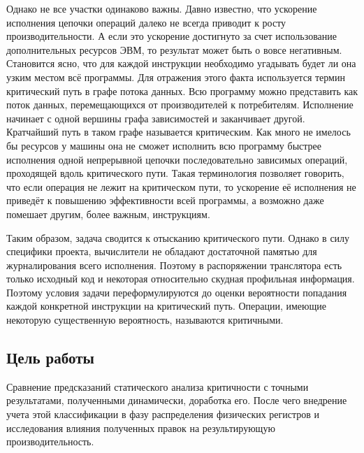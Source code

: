 \documentclass[a4paper,12pt,titlepage]{article}
\begin{document}
Однако не все участки одинаково важны. Давно известно, что ускорение исполнения цепочки операций далеко не всегда приводит к росту производительности. А если это ускорение достигнуто за счет использование дополнительных ресурсов ЭВМ, то результат может быть о вовсе негативным. Становится ясно, что для каждой инструкции необходимо угадывать будет ли она узким местом всё программы. Для отражения этого факта используется термин критический путь в графе потока данных. Всю программу можно представить как поток данных, перемещающихся от производителей к потребителям. Исполнение начинает с одной вершины графа зависимостей и заканчивает другой. Кратчайший путь в таком графе называется критическим. Как много не имелось бы ресурсов у машины она не сможет исполнить всю программу быстрее исполнения одной непрерывной цепочки последовательно зависимых операций, проходящей вдоль критического пути. Такая терминология позволяет говорить, что если операция не лежит на критическом пути, то ускорение её исполнения не приведёт к повышению эффективности всей программы, а возможно даже помешает другим, более важным, инструкциям.

Таким образом, задача сводится к отысканию критического пути. Однако в силу специфики проекта, вычислители не обладают достаточной памятью для журналирования всего исполнения. Поэтому в распоряжении транслятора есть только исходный код и некоторая относительно скудная профильная информация. Поэтому условия задачи переформулируются до оценки вероятности попадания каждой конкретной инструкции на критический путь. Операции, имеющие некоторую существенную вероятность, называются критичными.

\subsection{Цель работы}
Сравнение предсказаний статического анализа критичности с точными результатами, полученными динамически, доработка его. После чего внедрение учета этой классификации в фазу распределения физических регистров и исследования влияния полученных правок на результирующую производительность.

\pagebreak
\end{document}
